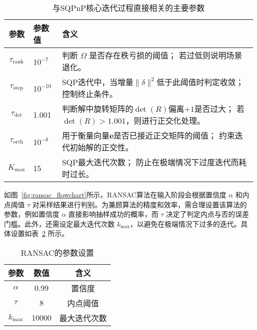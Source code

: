 \begin{table}[htb]
	\centering
	\caption{与SQPnP核心迭代过程直接相关的主要参数}
	\label{tab:SQPnP_coreparams}
	\begin{tabular}{cp{2cm}p{7cm}}
		\toprule
		参数 & 参数值 & 含义 \\ 
		\midrule
		\(\tau_{\mathrm{rank}}\)
		& \(10^{-7}\)
		& 判断 \(\Omega\) 是否存在秩亏损的阈值；
		若过低则说明场景退化。 \\[6pt]
		
		\(\tau_{\mathrm{step}}\)
		& \(10^{-10}\)
		& SQP迭代中，当增量\(\|\delta\|^2\)低于此阈值时判定收敛；
		控制终止条件。 \\[6pt]
		
		\(\tau_{\det}\)
		& 1.001
		& 判断解中旋转矩阵的\(\det(R)\)偏离\(+1\)是否过大；
		若\(\det(R) > 1.001\)，则进行正交化处理。 \\[6pt]
		
		\(\tau_{\mathrm{orth}}\)
		& \(10^{-8}\)
		& 用于衡量向量\(\mathbf{e}\)是否已接近正交矩阵的阈值；
		约束迭代初始解的正交性。 \\[6pt]
		
		\(K_{\max}\)
		& 15
		& SQP最大迭代次数；
		防止在极端情况下过度迭代而耗时过长。 \\
		\bottomrule
	\end{tabular}
\end{table}

如图~\ref{fig:ransac_flowchart}所示，RANSAC算法在输入阶段会根据置信度 $\alpha$ 和内点阈值 $\tau$ 对采样结果进行判别。为兼顾算法的精度和效率，需合理设置该算法的参数，例如置信度 $\alpha$ 直接影响抽样成功的概率，而 $\tau$ 决定了判定内点与否的误差门槛。此外，还需设定最大迭代次数 $k_{\max}$，以避免在极端情况下过多的迭代。具体设置如表~\ref{tab:ransac_params_setting} 所示。


\begin{table}[h!]
	\centering
	\caption{RANSAC的参数设置}
	\label{tab:ransac_params_setting}
	\begin{tabular}{ccc}
		\toprule
		参数 & 数值 & 含义 \\
		\midrule
		$\alpha$   & 0.99   & 置信度 \\
		$\tau$     & 8      & 内点阈值 \\
		$k_{\max}$ & 10000  & 最大迭代次数 \\
		\bottomrule
	\end{tabular}
\end{table}


